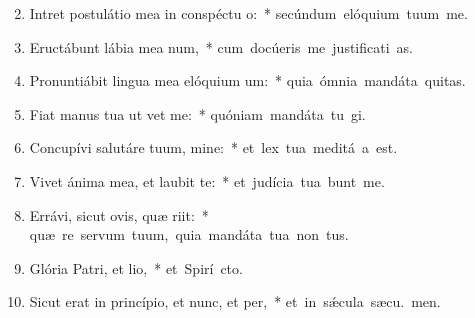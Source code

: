 \begin{flushleft}
\begin{enumerate}[leftmargin=*]
\setcounter{enumi}{1}

\item Intret postulátio mea in conspéctu o:~* \mbox{secúndum elóquium tuum  me.}
\item Eructábunt lábia mea num,~* \mbox{cum docúeris me justificati as.}
\item Pronuntiábit lingua mea elóquium um:~* \mbox{quia ómnia mandáta  \textaccent{\'{\ae}}quitas.}
\item Fiat manus tua ut vet me:~* \mbox{quóniam mandáta tu gi.}
\item Concupívi salutáre tuum, mine:~* \mbox{et lex tua meditá a est.}
\item Vivet ánima mea, et laubit te:~* \mbox{et judícia tua bunt me.}
\item Errávi, sicut ovis, quæ riit:~* \mbox{quæ re servum tuum, quia mandáta tua non  tus.}
\item Glória Patri, et lio,~* \mbox{et Spirí cto.}
\item Sicut erat in princípio, et nunc, et per,~* \mbox{et in s\'{\ae}cula sæcu. men.}


\end{enumerate}
\end{flushleft}


